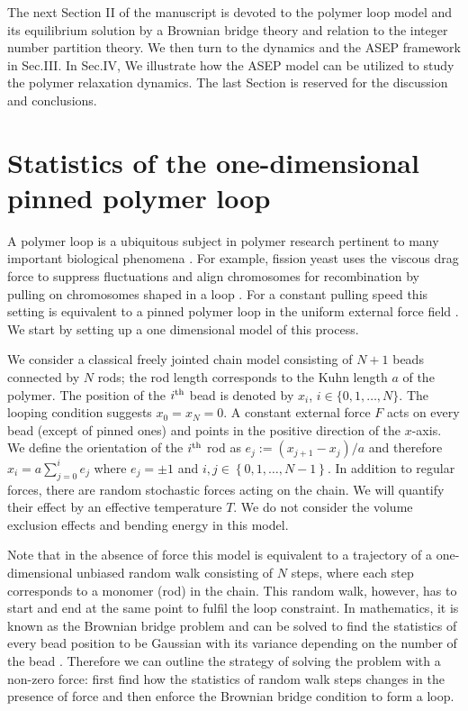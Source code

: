 \documentclass[aps,showpacs,twocolumn,floatfix,prx,superscriptaddress]{revtex4-1}
\begin{document}
The next Section II of the manuscript is devoted to the polymer loop model and
its equilibrium solution by a Brownian bridge theory and relation to the integer
number partition theory. We then turn to the dynamics and the ASEP framework in
Sec.III. In Sec.IV, We illustrate how the ASEP model can be utilized to study
the polymer relaxation dynamics. The last Section is reserved for the discussion
and conclusions.

\section{Statistics of the one-dimensional pinned polymer loop}
A polymer loop is a ubiquitous subject in polymer research pertinent to many
important biological phenomena \cite{}. For example, fission yeast uses the
viscous drag force to suppress fluctuations and align chromosomes for
recombination by pulling on chromosomes shaped in a loop \cite{}. For a constant
pulling speed this setting is equivalent to a pinned polymer loop in the uniform
external force field \cite{}. We start by setting up a one dimensional model of
this process.

We consider a classical freely jointed chain model consisting of $N+1$ beads
connected by $N$ rods; the rod length corresponds to the Kuhn length $a$ of the
polymer. The position of the $i^{\rm th}$ bead is denoted by $x_i$, $i\in\{0,1,
\ldots,N\}$. The looping condition suggests $x_0=x_N=0$. A constant external
force $F$ acts on every bead (except of pinned ones) and points in the positive
direction of the $x$-axis.  We define the orientation of the $i^{\rm th}$ rod as
$e_j:=(x_{j+1} - x_{j})/a$ and therefore $x_i = a\sum_{j=0}^{i} e_j$ where
$e_j=\pm 1$ and $i,j \in \left\{0, 1, \ldots, N-1\right\}$. In addition to
regular forces, there are random stochastic forces acting on the chain. We will
quantify their effect by an effective temperature $T$. We do not consider the
volume exclusion effects and bending energy in this model.

Note that in the absence of force this model is equivalent to a trajectory of a
one-dimensional unbiased random walk consisting of $N$ steps, where each step
corresponds to a monomer (rod) in the chain. This random walk, however, has to
start and end at the same point to fulfil the loop constraint. In mathematics,
it is known as the Brownian bridge problem and can be solved to find the
statistics of every bead position to be Gaussian with its variance depending on
the number of the bead \cite{}. Therefore we can outline the strategy of solving
the problem with a non-zero force: first find how the statistics of random walk
steps changes in the presence of force and then enforce the Brownian bridge
condition to form a loop. 
\end{document}
